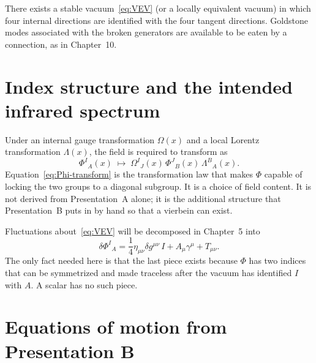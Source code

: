 \begin{assumption}
  \label{ass:frame-lock}
  There exists a stable vacuum~\eqref{eq:VEV} (or a locally equivalent
  vacuum) in which four internal directions are identified with the
  four tangent directions. Goldstone modes associated with the broken
  generators are available to be eaten by a connection, as in
  Chapter~10.
\end{assumption}

\section{Index structure and the intended infrared spectrum}
\label{sec:ch3-indices}

Under an internal gauge transformation \(\Omega(x)\) and a local
Lorentz transformation \(\Lambda(x)\), the field is required to
transform as
\begin{equation}
  \label{eq:Phi-transform}
  \Phi^I{}_A(x)
  \;\longmapsto\;
  \Omega^I{}_J(x)\,\Phi^J{}_B(x)\,\Lambda^B{}_A(x).
\end{equation}
Equation~\eqref{eq:Phi-transform} is the transformation law that
makes \(\Phi\) capable of locking the two groups to a diagonal
subgroup. It is a choice of field content. It is not derived from
Presentation~A alone; it is the additional structure that Presentation~B
puts in by hand so that a vierbein can exist.

Fluctuations about~\eqref{eq:VEV} will be decomposed in Chapter~5
into
\begin{equation}
  \label{eq:split-preview}
  \delta\Phi^I{}_A
  =\frac14\eta_{\mu\nu}\delta g^{\mu\nu}\,I
   +A_\mu\gamma^\mu
   +T_{\mu\nu}.
\end{equation}
The only fact needed here is that the last piece exists because
\(\Phi\) has two indices that can be symmetrized and made traceless
after the vacuum has identified \(I\) with \(A\). A scalar has no
such piece.

\section{Equations of motion from Presentation B}
\label{sec:ch3-eom}

